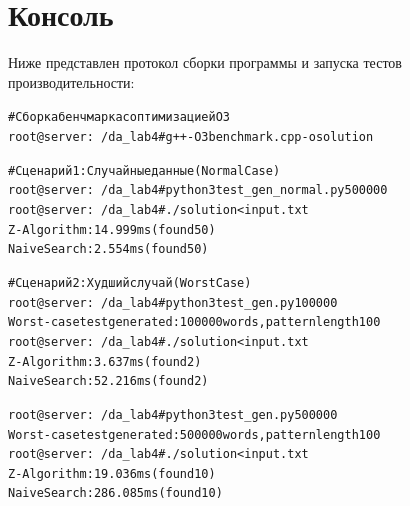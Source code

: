 \documentclass[unicode, 12pt, a4paper,oneside,fleqn]{article}
\begin{document}
\begin{center}
\end{center}

\pagebreak

\section{Консоль}
Ниже представлен протокол сборки программы и запуска тестов производительности:

\begin{alltt}
# Сборка бенчмарка с оптимизацией O3
root@server:~/da_lab4# g++ -O3 benchmark.cpp -o solution

# Сценарий 1: Случайные данные (Normal Case)
root@server:~/da_lab4# python3 test_gen_normal.py 500000
root@server:~/da_lab4# ./solution < input.txt
Z-Algorithm:    14.999 ms (found 50)
Naive Search:   2.554 ms (found 50)

# Сценарий 2: Худший случай (Worst Case)
root@server:~/da_lab4# python3 test_gen.py 100000
Worst-case test generated: 100000 words, pattern length 100
root@server:~/da_lab4# ./solution < input.txt
Z-Algorithm:    3.637 ms (found 2)
Naive Search:   52.216 ms (found 2)

root@server:~/da_lab4# python3 test_gen.py 500000
Worst-case test generated: 500000 words, pattern length 100
root@server:~/da_lab4# ./solution < input.txt
Z-Algorithm:    19.036 ms (found 10)
Naive Search:   286.085 ms (found 10)
\end{alltt}
\end{document}
